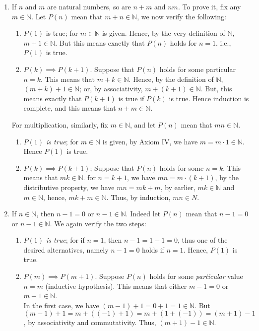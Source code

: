 \documentclass[12pt]{book}
\newcommand{\N}{\mathbb{N}}
\theoremstyle{definition}
\begin{document}
\begin{enumerate}[label=(\Alph*)]
	\item If $n$ and $m$ are natural numbers, so are $n+m$ and $nm$. To prove it, fix any $m \in \N$. Let $P(n)$ mean that $m+n \in \N$, we now verify the following:
		\begin{enumerate}[label=(\roman*)]
			\item $P(1)$ is true; for $m \in \N$ is given. Hence, by the very definition of $\N$, $m+1 \in \N$. But this means exactly that $P(n)$ holds for $n=1$. i.e., $P(1)$ is true.
			\item $P(k) \implies P(k+1)$. Suppose that $P(n)$ holds for some particular $n=k$. This means that $m+k \in \N$. Hence, by the definition of $\N$, $(m+k)+1 \in \N$; or, by associativity, $m+(k+1) \in \N$. But, this means exactly that $P(k+1)$ is true if $P(k)$ is true. Hence induction is complete, and this means that $n+m \in \N$.  
		\end{enumerate}
		For multiplication, similarly, fix $m \in \N$, and let $P(n)$ mean that $mn \in \N$.
		\begin{enumerate}[label=(\roman*)]
			\item \textit{$P(1)$ is true}; for $m \in \N$ is given, by Axiom IV, we have $m =m\cdot 1 \in \N$. Hence $P(1)$ is true.
			\item $P(k) \implies P(k+1)$; Suppose that $P(n)$ holds for some $n=k$. This means that $mk \in \N$. for $n=k+1$, we have $mn=m\cdot (k+1)$, by the distributive property, we have $mn=mk+m$, by earlier, $mk \in \N$ and $m \in \N$, hence, $mk+m \in \N$. Thus, by induction, $mn \in N$. 
		\end{enumerate}
	\item If $n \in \N$, then $n-1=0$ or $n-1 \in \N$. Indeed let $P(n)$ mean that $n-1 =0$ or $n-1 \in \N$. We again verify the two steps:
		\begin{enumerate}[label=(\roman*)]
			\item \textit{$P(1)$ is true}; for if $n=1$, then $n-1=1-1=0$, thus one of the desired alternatives, namely $n-1=0$ holds if $n=1$. Hence, $P(1)$ is true.
			\item $P(m) \implies P(m+1)$. Suppose $P(n)$ holds for some \textit{particular} value $n=m$ (inductive hypothesis). This means that either $m-1=0$ or $m-1 \in \N$. \\
				
				\indent In the first case, we have $(m-1)+1 =0 +1 =1 \in \N$. But $(m-1)+1 = m +((-1)+1)= m+ (1+(-1))=(m+1)-1$, by associativity and commutativity. Thus, $(m+1) -1 \in \N$. \\
				

\end{enumerate}
\end{enumerate}
\end{document}
